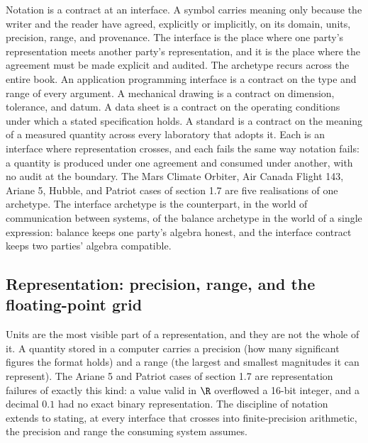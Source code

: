 \begin{archetype}[Interface]
Notation is a contract at an interface. A symbol carries meaning only
because the writer and the reader have agreed, explicitly or
implicitly, on its domain, units, precision, range, and provenance. The
interface is the place where one party's representation meets another
party's representation, and it is the place where the agreement must be
made explicit and audited. The archetype recurs across the entire book.
An application programming interface is a contract on the type and
range of every argument. A mechanical drawing is a contract on
dimension, tolerance, and datum. A data sheet is a contract on the
operating conditions under which a stated specification holds. A
standard is a contract on the meaning of a measured quantity across
every laboratory that adopts it. Each is an interface where
representation crosses, and each fails the same way notation fails: a
quantity is produced under one agreement and consumed under another,
with no audit at the boundary. The Mars Climate Orbiter, Air Canada
Flight 143, Ariane 5, Hubble, and Patriot cases of section 1.7 are five
realisations of one archetype. The interface archetype is the
counterpart, in the world of communication between systems, of the
balance archetype in the world of a single expression: balance keeps
one party's algebra honest, and the interface contract keeps two
parties' algebra compatible.
\end{archetype}

\subsection{Representation: precision, range, and the floating-point
grid}

Units are the most visible part of a representation, and they are not
the whole of it. A quantity stored in a computer carries a precision
(how many significant figures the format holds) and a range (the
largest and smallest magnitudes it can represent). The Ariane 5 and
Patriot cases of section 1.7 are representation failures of exactly
this kind: a value valid in $\R$ overflowed a 16-bit integer, and a
decimal $0.1$ had no exact binary representation. The discipline of
notation extends to stating, at every interface that crosses into
finite-precision arithmetic, the precision and range the consuming
system assumes.



